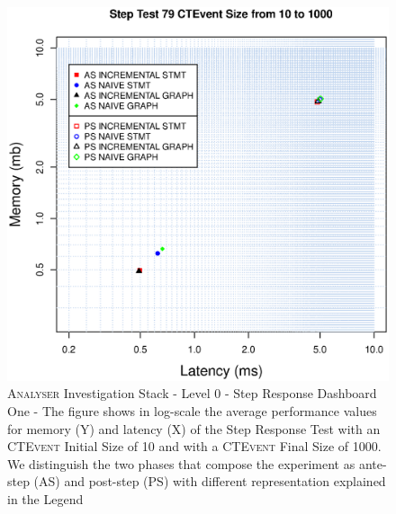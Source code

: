 \begin{figure}[htbp]
	\centering
	\includegraphics[width=\linewidth]{images/level-0-step-dashboard-1}	
	\caption[\textsc{Analyser} Investigation Stack - Level 0 - Step Response Dashboard One]{\textsc{Analyser} Investigation Stack - Level 0 - Step Response Dashboard One - The figure shows in log-scale the average performance values for memory (Y) and latency (X) of the Step Response Test with an \textsc{CTEvent} Initial Size of 10 and with a \textsc{CTEvent} Final Size of 1000. We distinguish the two phases that compose the experiment as ante-step (AS) and post-step (PS) with different representation explained in the Legend}
	\label{fig:level-0-step-dashboard-1}
\end{figure}
